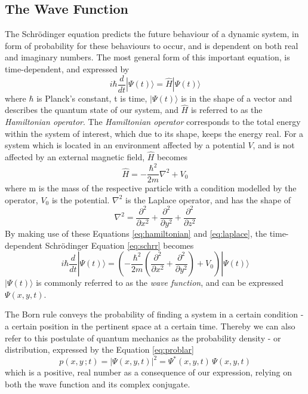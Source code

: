 \documentclass[10pt, nofootinbib, twocolumn]{revtex4-1}
\begin{document}
\subsection{The Wave Function}
The Schrödinger equation predicts the future behaviour of a dynamic system, in form of probability for these behaviours to occur, and is dependent on both real and imaginary numbers. The most general form of this important equation, is time-dependent, and expressed by 
\begin{equation}\label{eq:schrr}
    i \hbar \frac{d}{dt} |\Psi(t)\rangle = \hat{H} |\Psi(t)\rangle
\end{equation}
where $\hbar$ is Planck's constant, t is time, $|\Psi(t)\rangle$ is in the shape of a vector and describes the quantum state of our system, and $\hat{H}$ is referred to as the \textit{Hamiltonian operator}. The  \textit{Hamiltonian operator} corresponds to the total energy within the system of interest, which due to its shape, keeps the energy real. For a system which is located in an environment affected by a potential $V$, and is not affected by an external magnetic field, $\hat{H}$ becomes \cite{griffiths}
\begin{equation}\label{eq:hamiltonian}
    \hat{H}=-\frac{\hbar^2}{2m}\nabla^2 +V_0
\end{equation}
where m is the mass of the respective particle with a condition modelled by the operator, $V_0$ is the  potential. $\nabla^2$ is the Laplace operator, and has the shape of 
\begin{equation}\label{eq:laplace}
    \nabla^2= \frac{\partial^2}{\partial x^2}+ \frac{\partial^2}{\partial y^2}+ \frac{\partial^2}{\partial z^2}
\end{equation}
By making use of these Equations \eqref{eq:hamiltonian} and \eqref{eq:laplace}, the time-dependent Schrödinger Equation \eqref{eq:schrr} becomes
\begin{equation}\label{eq:schrlar}
    i \hbar \frac{d}{dt} |\Psi(t)\rangle = (-\frac{\hbar^2}{2m}(\frac{\partial^2}{\partial x^2}+ \frac{\partial^2}{\partial y^2}) +V_0) |\Psi(t)\rangle
\end{equation}
$|\Psi(t)\rangle$ is commonly referred to as the \textit{wave function}, and can be expressed $\Psi(x,y,t)$. 

The Born rule conveys the probability of finding a system in a certain condition - a certain position in the pertinent space at a certain time. Thereby we can also refer to this postulate of quantum mechanics as the probability density \cite{thermal} - or distribution, expressed by the Equation \eqref{eq:problar}
\begin{equation}\label{eq:problar}
    p(x,y\,;t) = |\Psi(x,y,t)|^2 = \Psi^*(x,y,t) \, \Psi(x,y,t)
\end{equation}
which is a positive, real number as a consequence of our expression, relying on both the wave function and its complex conjugate. \\
\end{document}
